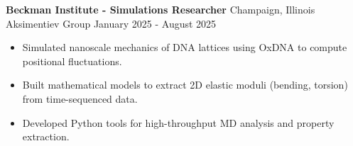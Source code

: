 \documentclass[a4paper,12pt]{extarticle}
\begin{document}
\vspace{\baselineskip}
\noindent
\textbf{Beckman Institute - Simulations Researcher}
\hfill Champaign, Illinois \\
Aksimentiev Group \hfill January 2025 - August 2025 

\begin{itemize}[topsep=0pt]
\itemindent=-13pt


\item Simulated nanoscale mechanics of DNA lattices using OxDNA to compute positional fluctuations.

\item Built mathematical models to extract 2D elastic moduli (bending, torsion) from time-sequenced data.

\item Developed Python tools for high-throughput MD analysis and property extraction.
\end{itemize}





\end{document}
